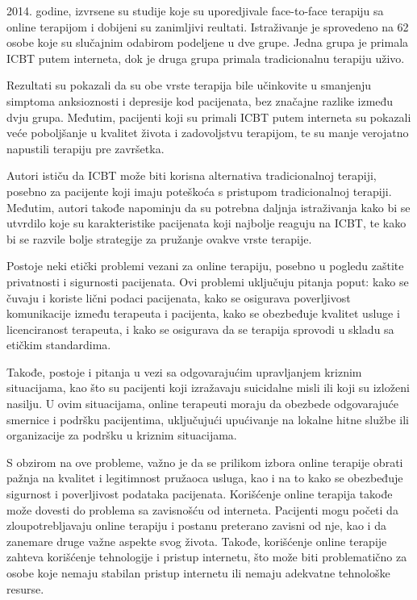 \documentclass[a4paper]{article}
\begin{document}
2014. godine, izvrsene su studije koje su uporedjivale face-to-face terapiju sa online terapijom i dobijeni su zanimljivi reultati. Istraživanje je sprovedeno na 62 osobe koje su slučajnim odabirom podeljene u dve grupe. Jedna grupa je primala ICBT putem interneta, dok je druga grupa primala tradicionalnu terapiju uživo.

Rezultati su pokazali da su obe vrste terapija bile učinkovite u smanjenju simptoma anksioznosti i depresije kod pacijenata, bez značajne razlike između dvju grupa. Međutim, pacijenti koji su primali ICBT putem interneta su pokazali veće poboljšanje u kvalitet života i zadovoljstvu terapijom, te su manje verojatno napustili terapiju pre završetka.

Autori ističu da ICBT može biti korisna alternativa tradicionalnoj terapiji, posebno za pacijente koji imaju poteškoća s pristupom tradicionalnoj terapiji. Međutim, autori takođe napominju da su potrebna daljnja istraživanja kako bi se utvrdilo koje su karakteristike pacijenata koji najbolje reaguju na ICBT, te kako bi se razvile bolje strategije za pružanje ovakve vrste terapije.

Postoje neki etički problemi vezani za online terapiju, posebno u pogledu zaštite privatnosti i sigurnosti pacijenata. Ovi problemi uključuju pitanja poput: kako se čuvaju i koriste lični podaci pacijenata, kako se osigurava poverljivost komunikacije između terapeuta i pacijenta, kako se obezbeđuje kvalitet usluge i licenciranost terapeuta, i kako se osigurava da se terapija sprovodi u skladu sa etičkim standardima.

Takođe, postoje i pitanja u vezi sa odgovarajućim upravljanjem kriznim situacijama, kao što su pacijenti koji izražavaju suicidalne misli ili koji su izloženi nasilju. U ovim situacijama, online terapeuti moraju da obezbede odgovarajuće smernice i podršku pacijentima, uključujući upućivanje na lokalne hitne službe ili organizacije za podršku u kriznim situacijama.

S obzirom na ove probleme, važno je da se prilikom izbora online terapije obrati pažnja na kvalitet i legitimnost pružaoca usluga, kao i na to kako se obezbeđuje sigurnost i poverljivost podataka pacijenata.
Korišćenje online terapija takođe može dovesti do problema sa zavisnošću od interneta. Pacijenti mogu početi da zloupotrebljavaju online terapiju i postanu preterano zavisni od nje, kao i da zanemare druge važne aspekte svog života. Takođe, korišćenje online terapije zahteva korišćenje tehnologije i pristup internetu, što može biti problematično za osobe koje nemaju stabilan pristup internetu ili nemaju adekvatne tehnološke resurse.
\end{document}
